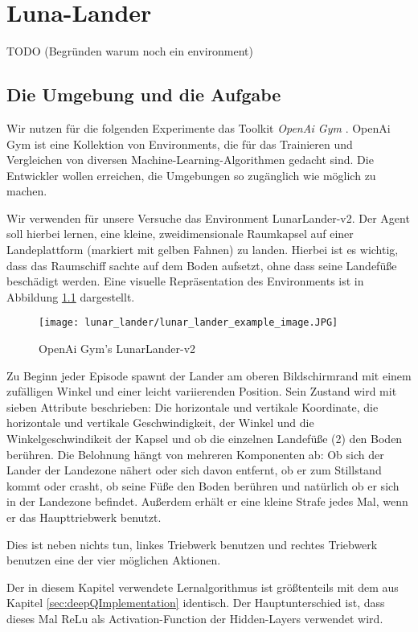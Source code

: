 \chapter{Luna-Lander}\label{sec:LunaLander}
TODO (Begründen warum noch ein environment)

\section{Die Umgebung und die Aufgabe}
Wir nutzen für die folgenden Experimente das Toolkit \textit{OpenAi Gym} \cite{x03_openaiGym}. OpenAi Gym ist eine Kollektion von Environments, die für das Trainieren und Vergleichen von diversen Machine-Learning-Algorithmen gedacht sind. Die Entwickler wollen erreichen, die Umgebungen so zugänglich wie möglich zu machen.

Wir verwenden für unsere Versuche das Environment \glqq LunarLander-v2\grqq{}. Der Agent soll hierbei lernen, eine kleine, zweidimensionale Raumkapsel auf einer Landeplattform (markiert mit gelben Fahnen) zu landen. Hierbei ist es wichtig, dass das Raumschiff sachte auf dem Boden aufsetzt, ohne dass seine Landefüße beschädigt werden. Eine visuelle Repräsentation des Environments ist in Abbildung \ref{img:lunarLanderExample} dargestellt.

\begin{figure}[h!]
    \centering
    \texttt{[image: lunar\_lander/lunar\_lander\_example\_image.JPG]}
    \caption{OpenAi Gym's \glqq LunarLander-v2\grqq{}} \label{img:lunarLanderExample}
\end{figure}

Zu Beginn jeder Episode spawnt der Lander am oberen Bildschirmrand mit einem zufälligen Winkel und einer leicht variierenden Position. Sein Zustand wird mit sieben Attribute beschrieben: Die horizontale und vertikale Koordinate, die horizontale und vertikale Geschwindigkeit, der Winkel und die Winkelgeschwindikeit der Kapsel und ob die einzelnen Landefüße (2) den Boden berühren. Die Belohnung hängt von mehreren Komponenten ab: Ob sich der Lander der Landezone nähert oder sich davon entfernt, ob er zum Stillstand kommt oder crasht, ob seine Füße den Boden berühren und natürlich ob er sich in der Landezone befindet. Außerdem erhält er eine kleine Strafe jedes Mal, wenn er das Haupttriebwerk benutzt.

Dies ist neben nichts tun, linkes Triebwerk benutzen und rechtes Triebwerk benutzen eine der vier möglichen Aktionen.

Der in diesem Kapitel verwendete Lernalgorithmus ist größtenteils mit dem aus Kapitel \ref{sec:deepQImplementation} identisch. Der Hauptunterschied ist, dass dieses Mal ReLu als Activation-Function der Hidden-Layers verwendet wird.

